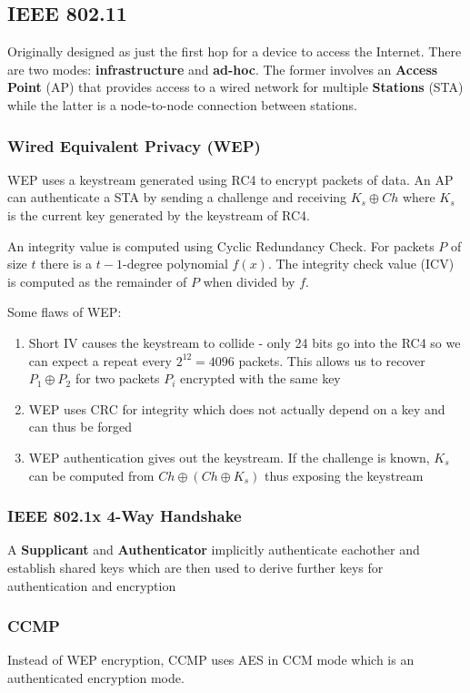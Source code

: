 \documentclass[11pt]{report}
\begin{document}
\subsection{IEEE 802.11}
Originally designed as just the first hop for a device to access the Internet. There are two modes: \textbf{infrastructure} and \textbf{ad-hoc}. The former involves an \textbf{Access Point} (AP) that provides access to a wired network for multiple \textbf{Stations} (STA) while the latter is a node-to-node connection between stations.

\subsubsection{Wired Equivalent Privacy (WEP)}

WEP uses a keystream generated using RC4 to encrypt packets of data. An AP can authenticate a STA by sending a challenge and receiving $K_s \oplus Ch$ where $K_s$ is the current key generated by the keystream of RC4.

An integrity value is computed using Cyclic Redundancy Check. For packets $P$ of size $t$ there is a $t-1$-degree polynomial $f(x)$. The integrity check value (ICV) is computed as the remainder of $P$ when divided by $f$.

Some flaws of WEP:

\begin{enumerate}
	\item Short IV causes the keystream to collide - only 24 bits go into the RC4 so we can expect a repeat every $2^{12} = 4096$ packets. This allows us to recover $P_1 \oplus P_2$ for two packets $P_i$ encrypted with the same key
	\item WEP uses CRC for integrity which does not actually depend on a key and can thus be forged
	\item WEP authentication gives out the keystream. If the challenge is known, $K_s$ can be computed from $Ch \oplus (Ch \oplus K_s)$ thus exposing the keystream
\end{enumerate}

\subsubsection{IEEE 802.1x 4-Way Handshake}
A \textbf{Supplicant} and \textbf{Authenticator} implicitly authenticate eachother and establish shared keys which are then used to derive further keys for authentication and encryption

\subsubsection{CCMP}
Instead of WEP encryption, CCMP uses AES in CCM mode which is an authenticated encryption mode.
\end{document}
